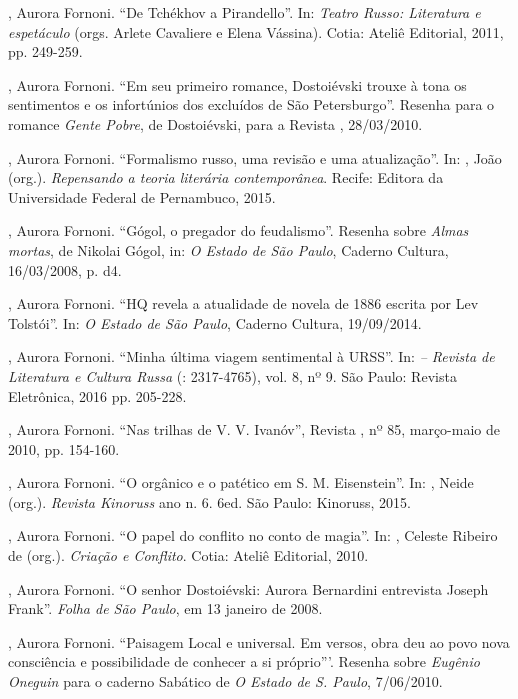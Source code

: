 \begin{Parskip}
, Aurora Fornoni. ``De Tchékhov a Pirandello''. In:
\emph{Teatro Russo: Literatura e espetáculo} (orgs. Arlete Cavaliere e
Elena Vássina). Cotia: Ateliê Editorial, 2011, pp. 249-259.

, Aurora Fornoni. ``Em seu primeiro romance, Dostoiévski
trouxe à tona os sentimentos e os infortúnios dos excluídos de São
Petersburgo''. Resenha para o romance \emph{Gente Pobre}, de
Dostoiévski, para a Revista , 28/03/2010.

, Aurora Fornoni. ``Formalismo russo, uma revisão e uma
atualização''. In: , João (org.). \emph{Repensando a teoria
literária contemporânea}. Recife: Editora da Universidade Federal de
Pernambuco, 2015.

, Aurora Fornoni. ``Gógol, o pregador do feudalismo''. Resenha
sobre \emph{Almas mortas}, de Nikolai Gógol, in: \emph{O Estado de São Paulo}, Caderno
Cultura, 16/03/2008, p. d4.

, Aurora Fornoni. ``HQ revela a atualidade de novela de 1886
escrita por Lev Tolstói''. In: \emph{O Estado de São Paulo}, Caderno
Cultura, 19/09/2014.

, Aurora Fornoni. ``Minha última viagem sentimental à URSS''.
In:\emph{ -- Revista de Literatura e Cultura Russa} (:
2317-4765), vol. 8, nº 9. São Paulo: Revista Eletrônica, 2016 pp.
205-228.

, Aurora Fornoni. ``Nas trilhas de V. V. Ivanóv'', Revista
, nº 85, março-maio de 2010, pp. 154-160.

, Aurora Fornoni. ``O orgânico e o patético em S. M.
Eisenstein''. In: , Neide (org.). \emph{Revista Kinoruss} ano 
n. 6. 6ed. São Paulo: Kinoruss, 2015.

, Aurora Fornoni. ``O papel do conflito no conto de magia''.
In: , Celeste Ribeiro de (org.). \emph{Criação e Conflito}. Cotia:
Ateliê Editorial, 2010.

, Aurora Fornoni. ``O senhor Dostoiévski: Aurora Bernardini
entrevista Joseph Frank''. \emph{Folha de São Paulo}, em 13 janeiro de
2008.

, Aurora Fornoni. ``Paisagem Local e universal. Em versos,
obra deu ao povo nova consciência e possibilidade de conhecer a si
próprio'''. Resenha sobre \emph{Eugênio Oneguin} para o caderno Sabático
de \emph{O Estado de S. Paulo}, 7/06/2010. 


\end{Parskip}
